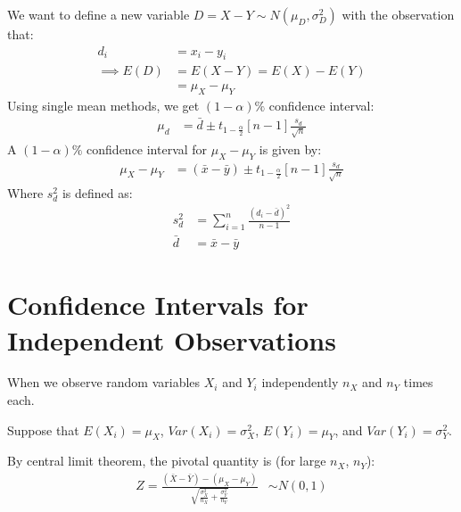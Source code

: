                 We want to define a new variable $D = X - Y \sim N(\mu_D, \sigma_D^2)$ with the observation that:
                \begin{align*}
                    d_i &= x_i - y_i \\
                    \implies E(D) &= E(X - Y) = E(X) - E(Y) \\
                    &= \mu_X - \mu_Y
                \end{align*}
                Using single mean methods, we get $(1 - \alpha)\%$ confidence interval:
                \begin{align*}
                    \mu_d &= \bar{d} \pm t_{1 - \frac{\alpha}{2}} [n-1] \frac{s_d}{\sqrt{n}}
                \end{align*}
                A $(1 - \alpha)\%$ confidence interval for $\mu_X - \mu_Y$ is given by:
                \begin{align*}
                    \mu_X - \mu_Y &= (\bar{x} - \bar{y}) \pm t_{1 - \frac{\alpha}{2}} [n-1] \frac{s_d}{\sqrt{n}}
                \end{align*}
                Where $s_d^2$ is defined as:
                \begin{align*}
                    s_d^2 &= \sum_{i=1}^n \frac{(d_i - \bar{d})^2}{n-1} \\
                    \bar{d} &= \bar{x} - \bar{y}
                \end{align*}
            \section{Confidence Intervals for Independent Observations} %
            \label{sec:confidence_intervals_for_independent_observations}
                When we observe random variables $X_i$ and $Y_i$ independently $n_X$ and $n_Y$ times each.

                Suppose that $E(X_i) = \mu_X$, $Var(X_i) = \sigma_X^2$, $E(Y_i) = \mu_Y$, and $Var(Y_i) = \sigma_Y^2$.

                By central limit theorem, the pivotal quantity is (for large $n_X$, $n_Y$):
                \begin{align*}
                    Z = \frac{(\bar{X} - \bar{Y}) - (\mu_X - \mu_Y)}{\sqrt{\frac{\sigma_X^2}{n_X} + \frac{\sigma_Y^2}{n_Y}}}
                    &\sim N(0, 1)
                \end{align*}

